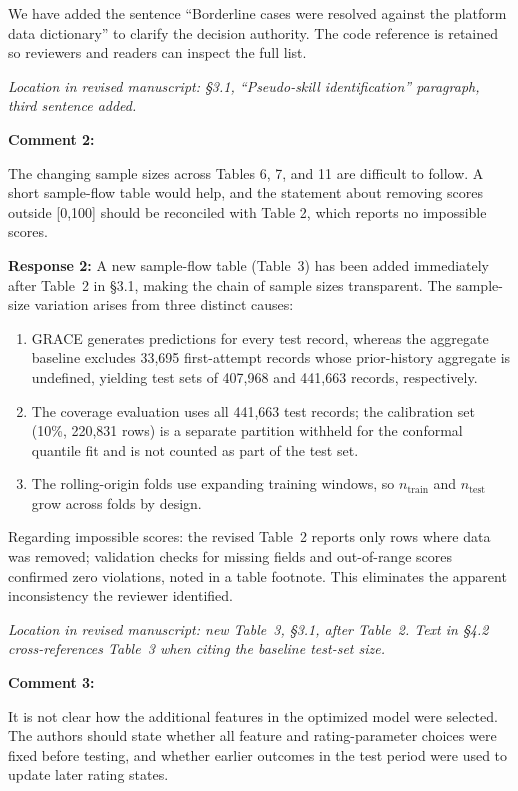 \documentclass[11pt]{article}
\newcommand{\rev}[1]{{\color{ccolor}#1}}
\begin{document}
We have added the sentence \rev{``Borderline cases were resolved against the platform
data dictionary''} to clarify the decision authority. The code reference is retained
so reviewers and readers can inspect the full list.

\textit{Location in revised manuscript: \S3.1, ``Pseudo-skill identification''
paragraph, third sentence added.}

\bigskip

\textbf{Comment 2:}
\begin{rquote}
The changing sample sizes across Tables 6, 7, and 11 are difficult to follow. A short
sample-flow table would help, and the statement about removing scores outside [0,100]
should be reconciled with Table 2, which reports no impossible scores.
\end{rquote}

\textbf{Response 2:}
A new sample-flow table (Table~3) has been added immediately after Table~2 in \S3.1,
making the chain of sample sizes transparent. The sample-size variation arises from three distinct causes:
\begin{enumerate}[topsep=2pt, itemsep=1pt]
  \item GRACE generates predictions for every test record, whereas the aggregate
        baseline excludes 33,695 first-attempt records whose prior-history aggregate
        is undefined, yielding test sets of 407,968 and 441,663 records, respectively.
  \item The coverage evaluation uses all 441,663 test records; the calibration set
        (10\%, 220,831 rows) is a separate partition withheld for the conformal quantile
        fit and is not counted as part of the test set.
  \item The rolling-origin folds use expanding training windows, so $n_{\text{train}}$
        and $n_{\text{test}}$ grow across folds by design.
\end{enumerate}
Regarding impossible scores: the revised Table~2 reports only rows where data was
removed; validation checks for missing fields and out-of-range scores confirmed zero
violations, noted in a table footnote.
This eliminates the apparent inconsistency the reviewer identified.

\textit{Location in revised manuscript: new Table~3, \S3.1, after Table~2.
Text in \S4.2 cross-references Table~3 when citing the baseline test-set size.}

\bigskip

\textbf{Comment 3:}
\begin{rquote}
It is not clear how the additional features in the optimized model were selected.
The authors should state whether all feature and rating-parameter choices were fixed
before testing, and whether earlier outcomes in the test period were used to update
later rating states.
\end{rquote}
\end{document}
